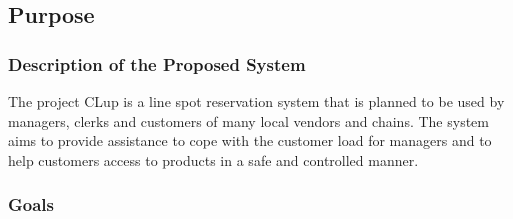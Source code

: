 \subsection{Purpose}

\subsubsection{Description of the Proposed System}
The project CLup is a line spot reservation system that is planned to be used by managers, clerks and customers of many local vendors and chains.
The system aims to provide assistance to cope with the customer load for managers and to help customers access to products in a safe and controlled manner.




\subsubsection{Goals}



